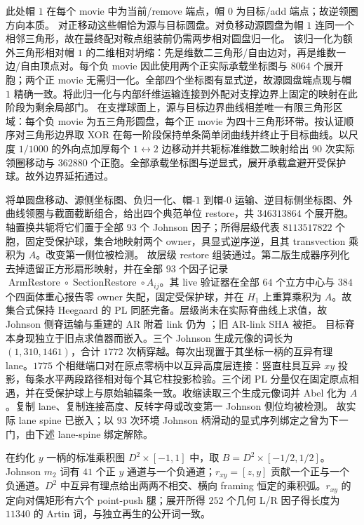 此处帽 $1$ 在每个 movie 中为当前/remove 端点，帽 $0$ 为目标/add 端点；故逆领圈方向本质。
对正移动这些帽恰为源与目标圆盘。对负移动源圆盘为帽 $1$ 连同一个相邻三角形，故在最终配对鞍点组装前仍需两步相对圆盘归一化。
该归一化为额外三角形相对帽 $1$ 的二维相对坍缩：先是维数二三角形/自由边对，再是维数一边/自由顶点对。每个负 movie 因此使用两个正实际承载坐标图与 $8064$ 个展开胞；两个正 movie 无需归一化。全部四个坐标图有显式逆，故源圆盘端点现与帽 $1$ 精确一致。将此归一化与内部纤维运输连接到外配对支撑边界上固定的映射在此阶段为剩余局部门。
在支撑球面上，源与目标边界曲线相差唯一有限三角形区域：每个负 movie 为五三角形圆盘，每个正 movie 为四十三角形环带。按认证顺序对三角形边界取 XOR 在每一阶段保持单条简单闭曲线并终止于目标曲线。以尺度 $1/1000$ 的外向点加厚每个 $1\leftrightarrow2$ 边移动并共轭标准维数二映射给出 $90$ 次实际领圈移动与 $362880$ 个正胞。全部承载坐标图与逆显式，展开承载盒避开受保护球。故外边界延拓通过。

将单圆盘移动、源侧坐标图、负归一化、帽-$1$ 到帽-$0$ 运输、逆目标侧坐标图、外曲线领圈与截面截断组合，给出四个典范单位 restore，共 $346313864$ 个展开胞。轴置换共轭将它们置于全部 $93$ 个 Johnson 因子；所得层级代表 $8113517822$ 个胞，固定受保护球，集合地映射两个 owner，具显式逆序逆，且其 transvection 乘积为 $A$。改变第一侧位被检测。
故层级 restore 组装通过。第二版生成器序列化去掉遗留正方形扇形映射，并在全部 $93$ 个因子记录
$\operatorname{ArmRestore}\circ\operatorname{SectionRestore}\circ A_{ij}$。其 live 验证器在全部 $64$ 个立方中心与 $384$ 个四面体重心报告零 owner 失配，固定受保护球，并在 $H_1$ 上重算乘积为 $A$。故集合式保持 Heegaard 的 PL 同胚完备。层级尚未在实际脊曲线上求值，故 Johnson 侧脊运输与重建的 AR 附着 link 仍为 \Open；旧 AR-link SHA 被拒。
目标脊本身现独立于旧点求值器而嵌入。三个 Johnson 生成元像的词长为
$(1,310,1461)$，合计 $1772$ 次柄穿越。每次出现置于其坐标一柄的互异有理 lane。$1775$ 个相继端口对在原点零柄中以互异高度层连接：竖直柱具互异 $xy$ 投影，每条水平两段路径相对每个其它柱投影检验。三个闭 PL 分量仅在固定原点相遇，并在受保护球上与原始轴辐条一致。收缩读取三个生成元像词并 Abel 化为 $A$。复制 lane、复制连接高度、反转字母或改变第一 Johnson 侧位均被检测。
故实际 lane spine 已嵌入；以 $93$ 次环境 Johnson 柄滑动的显式序列绑定之曾为下一门，由下述 lane-spine 绑定解除。

在约化 $y$ 一柄的标准乘积图 $D^2\times[-1,1]$ 中，取 $B=D^2\times[-1/2,1/2]$。Johnson $m_2$ 词有 $41$ 个正 $y$ 通道与一个负通道；$r_{xy}=[z,y]$ 贡献一个正与一个负通道。$D^2$ 中互异有理点给出两两不相交、横向 framing 恒定的乘积弧。$r_{xy}$ 的定向对偶矩形有六个 point-push 腿；展开所得 $252$ 个几何 L/R 因子得长度为 $11340$ 的 Artin 词，与独立再生的公开词一致。

